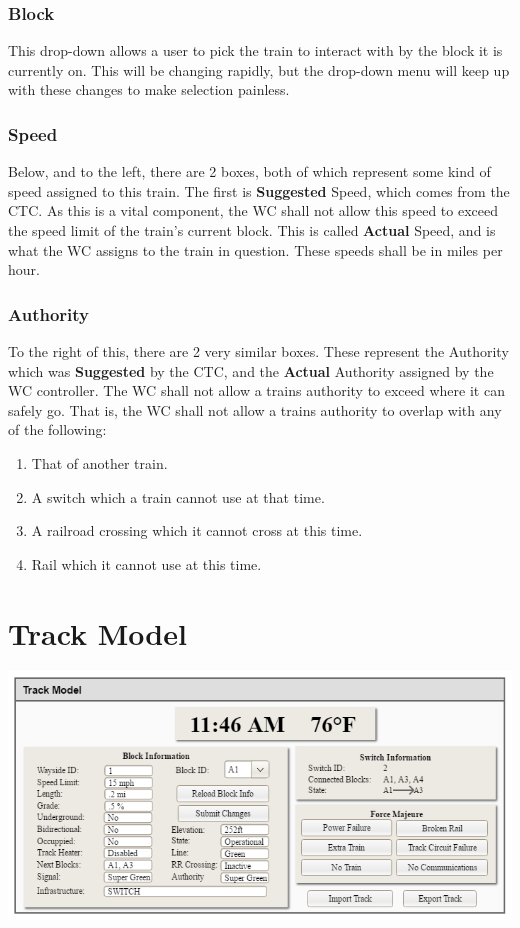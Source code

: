 \documentclass{scrreprt}
\begin{document}
\subsection{Block}
This drop-down allows a user to pick the train to interact with by the block it is currently on.
This will be changing rapidly, but the drop-down menu will keep up with these changes to make selection painless.

\subsection{Speed}
Below, and to the left, there are 2 boxes, both of which represent some kind of speed assigned to this train. The first is \textbf{Suggested} Speed, which comes from the CTC.
As this is a vital component, the WC shall not allow this speed to exceed the speed limit of the train's current block.
This is called \textbf{Actual} Speed, and is what the WC assigns to the train in question.
These speeds shall be in miles per hour.

\subsection{Authority}
To the right of this, there are 2 very similar boxes.
These represent the Authority which was \textbf{Suggested} by the CTC, and the \textbf{Actual} Authority assigned by the WC controller.
The WC shall not allow a trains authority to exceed where it can safely go.
That is, the WC shall not allow a trains authority to overlap with any of the following:

\begin{enumerate}
    \item That of another train.
    \item A switch which a train cannot use at that time.
    \item A railroad crossing which it cannot cross at this time.
    \item Rail which it cannot use at this time.
\end{enumerate}



\chapter{Track Model}

\includegraphics[width=\textwidth]{track-model}
\end{document}
